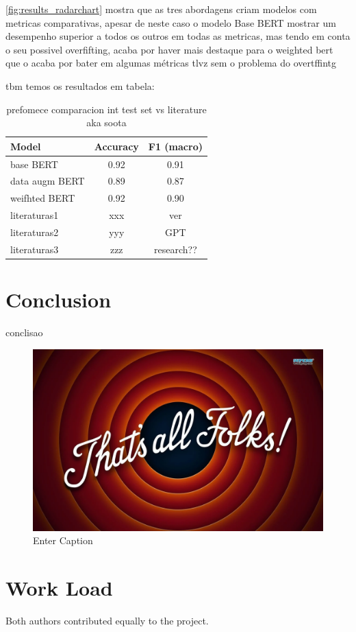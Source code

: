 \documentclass[conference]{IEEEtran}
\begin{document}
\ref{fig:results_radarchart} mostra que as tres abordagens criam modelos com metricas comparativas, apesar de neste caso o modelo Base BERT mostrar um desempenho superior a todos os outros em todas as metricas, mas tendo em conta o seu possivel overfifting, acaba por haver mais destaque para o weighted bert que o acaba por bater em algumas métricas tlvz sem o problema do overtffintg

tbm temos os resultados em tabela:

\begin{table}[H]
\centering
\caption{prefomece comparacion int test set vs literature aka soota}
\label{results_table}
\begin{tabular}{lcc}
\toprule
\textbf{Model} & \textbf{Accuracy} & \textbf{F1 (macro)} \\
\midrule
base BERT & 0.92 & 0.91 \\
data augm BERT & 0.89 & 0.87 \\
weifhted BERT & 0.92 & 0.90 \\
literaturas1 & xxx & ver \\
literaturas2 & yyy & GPT \\
literaturas3 & zzz & research?? \\
\bottomrule
\end{tabular}
\end{table}

\section{Conclusion}

conclisao

\begin{figure}[H]
    \centering
    \includegraphics[width=0.5\linewidth]{image.png}
    \caption{Enter Caption}
    \label{fig:enter-label}
\end{figure}

\section*{Work Load}

Both authors contributed equally to the project.



\end{document}
